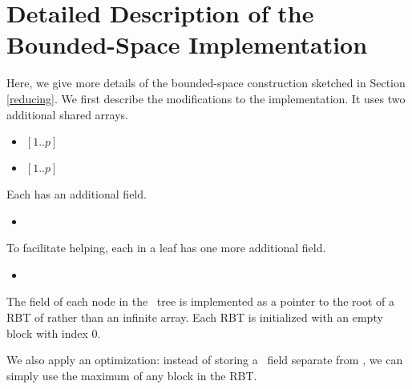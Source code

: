 
\section{Detailed Description of the Bounded-Space Implementation}
\label{reducing-details}


\renewcommand{\algorithmiccomment}[1]{\hfill\eqparbox{COMMENTSINGLEAPP}{\com\ #1}}

Here, we give more details of the bounded-space construction sketched in Section \ref{reducing}.
We first describe the modifications to the implementation.
It uses two additional shared arrays.
\begin{itemize}
\item {} $[1..p]$ 
\item {} $[1..p]$ 
\end{itemize}
Each  has an additional field.
\begin{itemize}
\item {}  
\end{itemize}
To facilitate helping, each  in a leaf has one more additional field.
\begin{itemize}
\item {}  
\end{itemize}
The  field of each node in the \ordering\ tree is implemented as a pointer to the root of a RBT of  rather than an infinite array.  Each RBT is initialized with an empty block with index 0.


We also apply an optimization:  instead of storing a \head\ field separate from ,
we can simply use the maximum  of any block in the  RBT.

